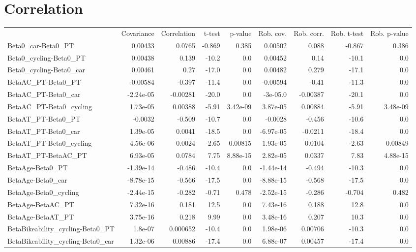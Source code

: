 \section{Correlation}
\begin{tabular}{lrrrrrrrr}
 & Covariance & Correlation & t-test & p-value & Rob. cov. & Rob. corr. & Rob. t-test & Rob. p-value \\
Beta0_car-Beta0_PT & 0.00433 & 0.0765 & -0.869 & 0.385 & 0.00502 & 0.088 & -0.867 & 0.386 \\
Beta0_cycling-Beta0_PT & 0.00438 & 0.139 & -10.2 & 0.0 & 0.00452 & 0.14 & -10.1 & 0.0 \\
Beta0_cycling-Beta0_car & 0.00461 & 0.27 & -17.0 & 0.0 & 0.00482 & 0.279 & -17.1 & 0.0 \\
BetaAC_PT-Beta0_PT & -0.00584 & -0.397 & -11.4 & 0.0 & -0.00594 & -0.41 & -11.3 & 0.0 \\
BetaAC_PT-Beta0_car & -2.24e-05 & -0.00281 & -20.0 & 0.0 & -3e-05.0 & -0.00387 & -20.1 & 0.0 \\
BetaAC_PT-Beta0_cycling & 1.73e-05 & 0.00388 & -5.91 & 3.42e-09 & 3.87e-05 & 0.00884 & -5.91 & 3.48e-09 \\
BetaAT_PT-Beta0_PT & -0.0032 & -0.509 & -10.7 & 0.0 & -0.0028 & -0.456 & -10.6 & 0.0 \\
BetaAT_PT-Beta0_car & 1.39e-05 & 0.0041 & -18.5 & 0.0 & -6.97e-05 & -0.0211 & -18.4 & 0.0 \\
BetaAT_PT-Beta0_cycling & 4.56e-06 & 0.0024 & -2.65 & 0.00815 & 1.93e-05 & 0.0104 & -2.63 & 0.00849 \\
BetaAT_PT-BetaAC_PT & 6.93e-05 & 0.0784 & 7.75 & 8.88e-15 & 2.82e-05 & 0.0337 & 7.83 & 4.88e-15 \\
BetaAge-Beta0_PT & -1.39e-14 & -0.486 & -10.4 & 0.0 & -1.44e-14 & -0.494 & -10.3 & 0.0 \\
BetaAge-Beta0_car & -8.78e-15 & -0.566 & -17.5 & 0.0 & -8.88e-15 & -0.568 & -17.5 & 0.0 \\
BetaAge-Beta0_cycling & -2.44e-15 & -0.282 & -0.71 & 0.478 & -2.52e-15 & -0.286 & -0.704 & 0.482 \\
BetaAge-BetaAC_PT & 7.32e-16 & 0.181 & 12.5 & 0.0 & 7.43e-16 & 0.188 & 12.8 & 0.0 \\
BetaAge-BetaAT_PT & 3.75e-16 & 0.218 & 9.99 & 0.0 & 3.48e-16 & 0.207 & 10.3 & 0.0 \\
BetaBikeability_cycling-Beta0_PT & 1.8e-07 & 0.000652 & -10.4 & 0.0 & 1.98e-06 & 0.00706 & -10.3 & 0.0 \\
BetaBikeability_cycling-Beta0_car & 1.32e-06 & 0.00886 & -17.4 & 0.0 & 6.88e-07 & 0.00457 & -17.4 & 0.0 \\

\end{tabular}
